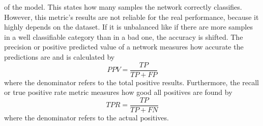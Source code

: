 of the model.
This states how many samples the network correctly classifies.
However, this metric's results are not reliable for the real performance, because it highly depends on the dataset.
If it is unbalanced like if there are more samples in a well classifiable category than in a bad one, the accuracy is shifted.
The precision or positive predicted value of a network measures how accurate the predictions are and is calculated by
\begin{equation}
	\label{eq:metric-precision}
	PPV = \frac{TP}{TP + FP}
\end{equation}
where the denominator refers to the total positive results.
Furthermore, the recall or true positive rate metric measures how good all positives are found by
\begin{equation}
	\label{eq:metric-recall}
	TPR = \frac{TP}{TP + FN}
\end{equation}
where the denominator refers to the actual positives.